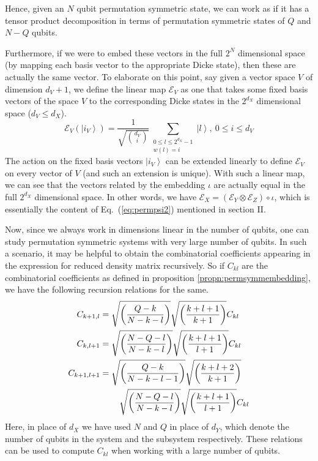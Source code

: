 \documentclass[pre,aps,showpacs,showkeys,twocolumn]{revtex4-1}
\newcommand\ket[1]{\left|#1\right\rangle}
\theoremstyle{definition}
\theoremstyle{remark}
\begin{document}
Hence, given an $N$ qubit permutation symmetric state, we can work as if it has a tensor product decomposition in terms of permutation symmetric states of $Q$ and $N - Q$ qubits.

Furthermore, if we were to embed these vectors in the full $2^N$ dimensional space (by mapping each basis vector to the appropriate Dicke state), then these are actually the same vector. To elaborate on this point, say given a vector space $V$ of dimension $d_V + 1$, we define the linear map $\mathcal{E}_V$ as one that takes some fixed basis vectors of the space $V$ to the corresponding Dicke states in the $2^{d_X}$ dimensional space ($d_V \leq d_X$).
\begin{equation}
    \mathcal{E}_V(\ket{i_V}) = \frac{1}{\sqrt{\binom{d_V}{i}}} \sum_{\substack{0 \leq l \leq 2^{d_X} - 1\\ w(l) = i}} \ket{l},\
                                                                                                                            0 \leq i \leq d_V
\end{equation}
The action on the fixed basis vectors $\ket{i_V}$ can be extended linearly to define $\mathcal{E}_V$ on every vector of $V$ (and such an extension is unique). With such a linear map, we can see that the vectors related by the embedding $\iota$ are actually equal in the full $2^{d_X}$ dimensional space. In other words, we have $\mathcal{E}_X = (\mathcal{E}_Y \otimes \mathcal{E}_Z) \circ \iota$, which is essentially the content of Eq.~(\ref{eq:permpsi2}) mentioned in section II.

Now, since we always work in dimensions linear in the number of qubits, one can study permutation symmetric systems with very large number of qubits. In such a scenario, it may be helpful to obtain the combinatorial coefficients appearing in the expression for reduced density matrix recursively. So if $C_{kl}$ are the combinatorial coefficients as defined in proposition \ref{propn:permsymmembedding}, we have the following recursion relations for the same.
\begin{align}
    C_{k+1,l}   &= \sqrt{\left(\frac{Q - k}{N - k - l}\right)} \sqrt{\left(\frac{k + l + 1}{k + 1}\right)} C_{kl} \\
    C_{k,l+1}   &= \sqrt{\left(\frac{N - Q - l}{N - k - l}\right)} \sqrt{\left(\frac{k + l + 1}{l + 1}\right)} C_{kl} \\
    C_{k+1,l+1} &= \sqrt{\left(\frac{Q - k}{N - k - l - 1}\right)} \sqrt{\left(\frac{k + l + 2}{k + 1}\right)} \\
                    &\hspace{0.8cm}\sqrt{\left(\frac{N - Q - l}{N - k - l}\right)} \sqrt{\left(\frac{k + l + 1}{l + 1}\right)} C_{kl}
\end{align}
Here, in place of $d_X$ we have used $N$ and $Q$ in place of $d_Y$, which denote the number of qubits in the system and the subsystem respectively. These relations can be used to compute $C_{kl}$ when working with a large number of qubits.
\end{document}
